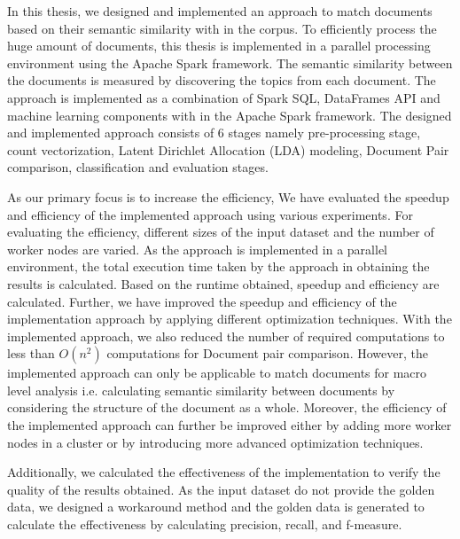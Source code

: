 \label{conclusion}

In this thesis, we designed and implemented an approach to match documents based on their semantic similarity with in the corpus. To efficiently process the huge amount of documents, this thesis is implemented in a parallel processing environment using the Apache Spark framework. The semantic similarity between the documents is measured by discovering the topics from each document. The approach is implemented as a combination of Spark SQL, DataFrames API and machine learning components with in the Apache Spark framework. The designed and implemented approach consists of 6 stages namely pre-processing stage, count vectorization, Latent Dirichlet Allocation (LDA) modeling, Document Pair comparison, classification and evaluation stages.

\par As our primary focus is to increase the efficiency, We have evaluated the speedup and efficiency of the implemented approach using various experiments. For evaluating the efficiency, different sizes of the input dataset and the number of worker nodes are varied. As the approach is implemented in a parallel environment, the total execution time taken by the approach in obtaining the results is calculated. Based on the runtime obtained, speedup and efficiency are calculated. Further, we have improved the speedup and efficiency of the implementation approach by applying different optimization techniques. With the implemented approach, we also reduced the number of required computations  to less than \(O(n^2)\) computations for Document pair comparison. However, the implemented approach can only be applicable to match documents for macro level analysis i.e. calculating semantic similarity between documents by considering the structure of the document as a whole. Moreover, the efficiency of the implemented approach can further be improved either by adding more worker nodes in a cluster or by introducing more advanced optimization techniques.

Additionally, we calculated the effectiveness of the implementation to verify the quality of the results obtained. As the input dataset do not provide the golden data, we designed a workaround method and the golden data is generated to calculate the effectiveness by calculating precision, recall, and f-measure.